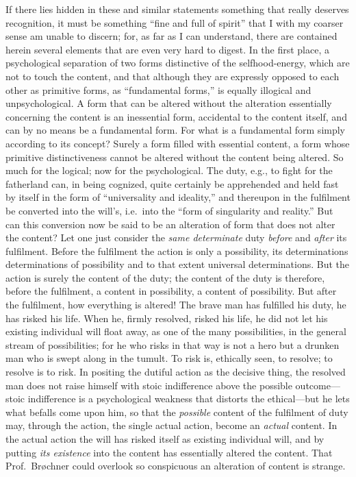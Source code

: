 \documentclass[12pt]{book}
\newcommand{\opage}[1]{\marginnote{\footnotesize\textit{[#1]}}}
\begin{document}
If there lies hidden in these and similar statements something that really
deserves recognition, it must be something ``fine and full of spirit''
that I with my coarser sense am unable to discern; for, as far as I can
understand, there are contained herein several elements that are even very
hard to digest. In the first place, a psychological separation of two
forms distinctive of the selfhood-energy, which are not to touch the
content, and that although they are expressly opposed to each other as
primitive forms, as ``fundamental forms,'' is equally illogical and
unpsychological. A form that can be altered without the alteration
essentially concerning the content is an inessential form, accidental to
the content itself, and can by no means be a fundamental form. For what is
a fundamental form simply according to its concept? Surely a form filled
with essential content, a form whose primitive distinctiveness cannot be
altered without the content being altered. So much for the logical; now
for the psychological. The duty, e.g., to fight for the fatherland can, in
being cognized, quite certainly be apprehended and held fast by itself in
the form of ``universality and ideality,'' and thereupon in the fulfilment
be converted into the will's, i.e.\ into the ``form of singularity and
reality.'' But can this conversion now be said to be an alteration of form
that does not alter the content?
\opage{38}\setcounter{footnote}{0}%
Let one just consider the \emph{same determinate} duty \emph{before} and
\emph{after} its fulfilment. Before the fulfilment the action is only a
possibility, its determinations determinations of possibility and to that
extent universal determinations. But the action is surely the content of
the duty; the content of the duty is therefore, before the fulfilment, a
content in possibility, a content of possibility. But after the
fulfilment, how everything is altered! The brave man has fulfilled his
duty, he has risked his life. When he, firmly resolved, risked his life,
he did not let his existing individual will float away, as one of the many
possibilities, in the general stream of possibilities; for he who risks in
that way is not a hero but a drunken man who is swept along in the
tumult. To risk is, ethically seen, to resolve; to resolve is to risk. In
positing the dutiful action as the decisive thing, the resolved man does
not raise himself with stoic indifference above the possible
outcome---stoic indifference is a psychological weakness that distorts the
ethical---but he lets what befalls come upon him, so that the
\emph{possible} content of the fulfilment of duty may, through the action,
the single actual action, become an \emph{actual} content. In the actual
action the will has risked itself as existing individual will, and by
putting \emph{its existence} into the content has essentially altered the
content. That Prof.~Brøchner could overlook so conspicuous an alteration
of content is strange.
\end{document}
